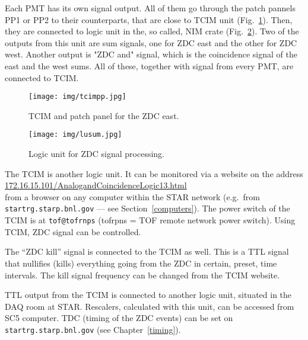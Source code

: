 Each PMT has its own signal output. All of them go through the patch pannels PP1 or PP2 to their counterparts, that are close to TCIM unit (Fig.~\ref{tcimpp}). Then, they are connected to logic unit in the, so called, NIM crate (Fig.~\ref{lu_sum}). Two of the outputs from this unit are sum signals, one for ZDC east and the other for ZDC west. Another output is "ZDC and" signal, which is the coincidence signal of the east and the west sums. All of these, together with signal from every PMT, are connected to TCIM.

\begin{figure}[htb]
\begin{center}
\texttt{[image: img/tcimpp.jpg]}
\end{center}
\caption{TCIM and patch panel for the ZDC east.}
\label{tcimpp}
\end{figure}


\begin{figure}[htb]
\begin{center}
\texttt{[image: img/lusum.jpg]}
\end{center}
\caption{Logic unit for ZDC signal processing.}
\label{lu_sum}
\end{figure}

The TCIM is another logic unit.  It can be monitored via a website on the address\\
\url{172.16.15.101/AnalogandCoincidenceLogic13.html}\\
from a browser on any computer within the STAR network (e.g.\ from \texttt{startrg.starp.bnl.gov} --- see Section~\ref{computers})\@. The power switch of the TCIM is at \texttt{tof@tofrnps} (tofrpns = TOF remote network power switch). Using TCIM, ZDC signal can be controlled. 

The ``ZDC kill'' signal is connected to the TCIM as well. This is a TTL signal that nullifies (kills) everything going from the ZDC in certain, preset, time intervals. The kill signal frequency can be changed from the TCIM website.

TTL output from the TCIM is connected to another logic unit, situated in the DAQ room at STAR\@. Rescalers, calculated with this unit, can be accessed from SC5 computer.
TDC (timing of the ZDC events) can be set on \texttt{startrg.starp.bnl.gov} (see Chapter~\ref{timing}).


